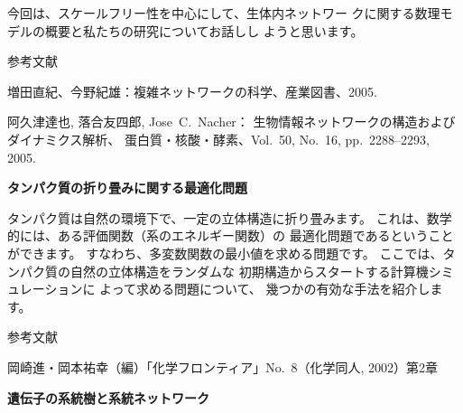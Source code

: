 \documentclass[uplatex,dvipdfmx]{jlreq}
\begin{document}
今回は、スケールフリー性を中心にして、生体内ネットワー
クに関する数理モデルの概要と私たちの研究についてお話しし
ようと思います。

\begin{center}\textsc{参考文献}\end{center}
\begin{enumerate}[{[1]}]
  \item 増田直紀、今野紀雄：複雑ネットワークの科学、産業図書、2005.
  \item 阿久津達也, 落合友四郎, Jose~C.~Nacher：
    生物情報ネットワークの構造およびダイナミクス解析、
    蛋白質・核酸・酵素、Vol.~50, No.~16, pp.~2288--2293, 2005.
\end{enumerate}

\vfill

\newpage

\begin{center}
{\large\bfseries タンパク質の折り畳みに関する最適化問題}\\[6pt]
\hspace*{\fill}{\large\bfseries 岡本 祐幸（名古屋大学 大学院理学研究科・物理学教室）}
\end{center}

タンパク質は自然の環境下で、一定の立体構造に折り畳みます。
これは、数学的には、ある評価関数（系のエネルギー関数）の
最適化問題であるということができます。
すなわち、多変数関数の最小値を求める問題です。
ここでは、タンパク質の自然の立体構造をランダムな
初期構造からスタートする計算機シミュレーションに
よって求める問題について、
幾つかの有効な手法を紹介します。

\begin{center}\textsc{参考文献}\end{center}

岡崎進・岡本祐幸（編）「化学フロンティア」No.~8（化学同人, 2002）第2章

\vfill

\newpage

\begin{center}
{\large\bfseries 遺伝子の系統樹と系統ネットワーク}\\[6pt]
\hspace*{\fill}{\large\bfseries 斎藤 成也（国立遺伝学研究所）}
\end{center}
\end{document}

